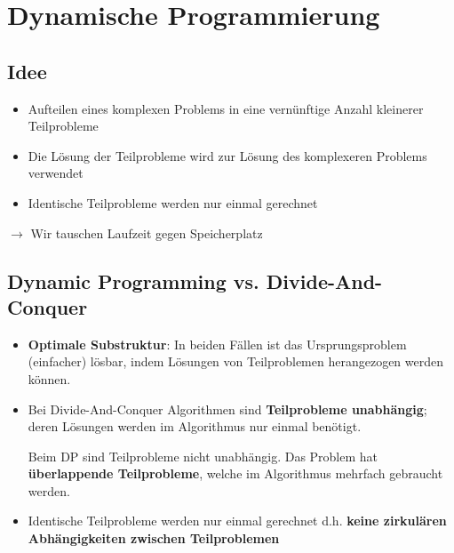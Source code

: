 \section{Dynamische Programmierung}

\begin{sectionbox}
\subsection{Idee}\smallskip
\begin{itemize}
    \item Aufteilen eines komplexen Problems in eine vernünftige Anzahl kleinerer Teilprobleme
    \item Die Lösung der Teilprobleme wird zur Lösung des komplexeren Problems verwendet
    \item Identische Teilprobleme werden nur einmal gerechnet
\end{itemize}\smallskip
$\rightarrow$ Wir tauschen Laufzeit gegen Speicherplatz
\end{sectionbox}

\begin{sectionbox}
\subsection{Dynamic Programming vs. Divide-And-Conquer}\smallskip
\begin{itemize}
    \item \textbf{Optimale Substruktur}: In beiden Fällen ist das Ursprungsproblem (einfacher) lösbar, indem Lösungen von Teilproblemen herangezogen werden können.
    \item Bei Divide-And-Conquer Algorithmen sind \textbf{Teilprobleme unabhängig}; deren Lösungen werden im Algorithmus nur einmal benötigt.\par
    Beim DP sind Teilprobleme nicht unabhängig. Das Problem hat \textbf{überlappende Teilprobleme}, welche im Algorithmus mehrfach gebraucht werden.
    \item Identische Teilprobleme werden nur einmal gerechnet d.h. \textbf{keine zirkulären Abhängigkeiten zwischen Teilproblemen}
\end{itemize}\smallskip
\end{sectionbox}

